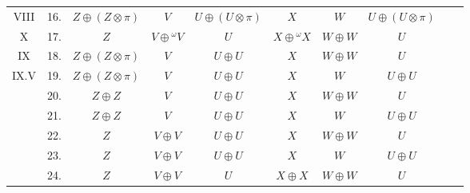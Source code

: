 \begin{table}[p]
\begin{tabular}{c r c c c c c c c c}
VIII & 16. & $Z \oplus (Z \otimes \pi)$ & $V$ & $U \oplus (U \otimes \pi)$ & $X$ & $W$ & $U \oplus (U \otimes \pi)$  \\ 
X & 17. & $Z$ & $V \oplus {}^{\omega} V$ & $U$ & $X \oplus {}^{\omega} X$ & $W \oplus W$ & $U$ \\ 
IX & 18. & $Z \oplus (Z \otimes \pi)$ & $V$ & $U \oplus U$ & $X$ & $W \oplus W$ & $U$ \\ 
IX.V & 19. & $Z \oplus (Z \otimes \pi)$ & $V$ & $U \oplus U$ & $X$ & $W$ & $U \oplus U$   \\ 
& 20. & $Z \oplus Z$ & $V$ & $U \oplus U$ & $X$ & $W \oplus W$ & $U$ \\ 
& 21. & $Z \oplus Z$ & $V$ &$U \oplus U$ & $X$ & $W$ & $U \oplus U$   \\ 
& 22. & $Z$ & $V \oplus V$ & $U \oplus U$ & $X$ & $W \oplus W$ & $U$ \\ 
& 23. & $Z$ & $V \oplus V$ & $U \oplus U$ & $X$ & $W$ & $U \oplus U$ \\ 
& 24. & $Z$ & $V \oplus V$ &$U$ & $X \oplus X$ & $W \oplus W$ & $U$ \\
\bottomrule
\end{tabular}
\egroup
\end{table}

